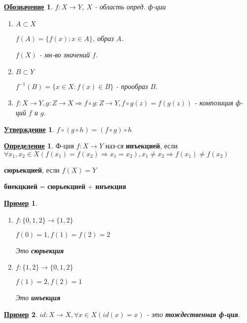 \documentclass[12pt]{article}
\newtheorem{statement}{\underline{Утверждение}}[section]
\newtheorem*{symb}{\underline{Обозначение}}
\newtheorem*{example}{\underline{Пример}}
\theoremstyle{definition}
\newtheorem{definition}{\underline{Определение}}[section]
\theoremstyle{definition}
\begin{document}
\begin{symb}
$f: X \rightarrow Y$, $X$ - область опред. ф-ции

\begin{enumerate}
    \item $A \subset X$ 

    $f(A) = \{f(x) \colon x \in A\}$, образ $A$.

    $f(X)$ - мн-во значений $f$.

    \item $B \subset Y$

    $f^{-1}(B) = \{x \in X \colon f(x) \in B\}$ - прообраз $B$.

    \item $f: X \rightarrow Y, g: Z \rightarrow X \Rightarrow f \circ g: Z \rightarrow Y, f \circ g(z) = f(g(z))$ - композиция ф-ций $f$ и $g$.
\end{enumerate}
\end{symb}

\begin{statement}
$f \circ (g \circ h) = (f \circ g) \circ h$
\end{statement}

\begin{definition}
Ф-ция $f: X \rightarrow Y$ наз-ся  \textbf{инъекцией}, если $\forall x_1, x_2 \in X (f(x_1) = f(x_2) \Rightarrow x_1 = x_2), x_1 \neq x_2 \Rightarrow f(x_1) \neq f(x_2)$ 

\textbf{сюрьекцией}, если $f(X) = Y$

\textbf{биекцкией} = \textbf{сюрьекцией} + \textbf{инъекция}
\end{definition}
\begin{example}
\begin{enumerate}
    \item 
        
$f: \{0, 1, 2\} \rightarrow \{1, 2\}$ 

$f(0) = 1, f(1) = f(2) = 2$

Это \textbf{сюрьекция}
    \item
$f: \{1, 2\} \rightarrow \{0, 1, 2\}$ 

$f(1) = 2, f(2) = 1$ 

Это \textbf{инъекция}
\end{enumerate}

\end{example}

\begin{example}
$id: X \rightarrow X, \forall x \in X (id(x) = x)$ - это \textbf{тождественная ф-ция}.
\end{example}
\end{document}
